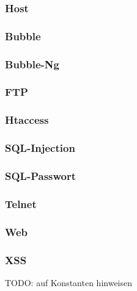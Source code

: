 \subsubsection{Host}

\subsubsection{Bubble}

\subsubsection{Bubble-Ng}

\subsubsection{FTP}

\subsubsection{Htaccess}

\subsubsection{SQL-Injection}

\subsubsection{SQL-Passwort}

\subsubsection{Telnet}

\subsubsection{Web}

\subsubsection{XSS}



TODO: auf Konstanten hinweisen